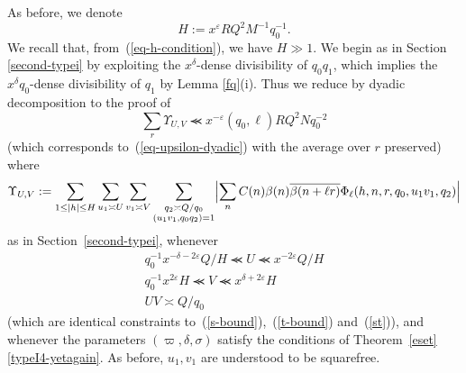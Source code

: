 \documentclass[12pt,a4paper,reqno]{amsart}
\numberwithin{equation}{section}
\theoremstyle{plain}
\theoremstyle{definition}
\newcommand\eps{\varepsilon}
\def\stacksum#1#2{{\stackrel{{\scriptstyle #1}}
{{\scriptstyle #2}}}}
\renewcommand{\sim}{\asymp}
\renewcommand{\lessapprox}{\llcurly}
\begin{document}

As before, we denote
\begin{equation}\label{eq-h-bis}
H:=x^{\eps}RQ^2M^{-1}q_0^{-1}.
\end{equation}
We recall that, from~(\ref{eq-h-condition}), we have $H\gg 1$.  We
begin as in Section \ref{second-typei} by exploiting the $x^\delta$-dense
divisibility of $q_0q_1$, which implies the $x^\delta q_0$-dense divisibility of $q_1$ by Lemma \ref{fq}(i). Thus we reduce by dyadic decomposition to
the proof of
\begin{equation}\label{eq-dyadic-2}
\sum_{r}\Upsilon_{U,V}\lessapprox  x^{-\eps}(q_0,\ell)RQ^2Nq_0^{-2}
\end{equation}
(which corresponds to~(\ref{eq-upsilon-dyadic}) with the average over
$r$ preserved) where
$$
\Upsilon_{U,V}:=\sum_{1 \leq |h| \leq H} \sum_{u_1 \sim U} \sum_{v_1
  \sim V} \sum_{\substack{q_2 \sim Q/q_0\\ (u_1v_1,q_0 q_2)= 1}}\Bigl|
\sum_n C(n)\beta(n) \overline{\beta(n+\ell r)}
\Phi_{\ell}(h,n,r,q_0,u_1v_1,q_2)\Bigr|
$$
as in Section~\ref{second-typei}, whenever
\begin{gather}
  q_0^{-1} x^{-\delta-2\eps} Q/H \lessapprox U \lessapprox x^{-2\eps} Q/H \label{s-bound-2}\\
  q_0^{-1} x^{2\eps} H \lessapprox V \lessapprox x^{\delta+2\eps} H \label{t-bound-2}\\
  UV \sim Q/q_0 \label{st-2}
\end{gather}
(which are identical constraints to~(\ref{s-bound}),~(\ref{t-bound})
and~(\ref{st})), and whenever the parameters $(\varpi,\delta,\sigma)$
satisfy the conditions of Theorem~\ref{eset}\eqref{typeI4-yetagain}.  As before, $u_1,v_1$ are understood to be squarefree.
\par
\end{document}
